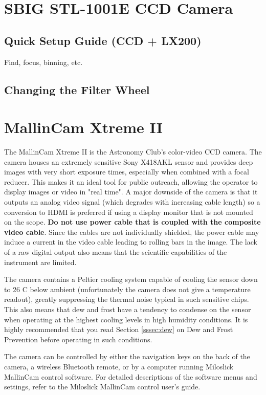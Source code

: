 \documentclass[12pt,titlepage]{article}
\begin{document}
\section{SBIG STL-1001E CCD Camera}
\subsection{Quick Setup Guide (CCD + LX200)}
Find, focus, binning, etc.
\subsection{Changing the Filter Wheel}


\section{MallinCam Xtreme II}
The MallinCam Xtreme II is the Astronomy Club's color-video CCD camera.
The camera houses an extremely sensitive Sony X418AKL sensor and provides deep images with very short exposure times, especially when combined with a focal reducer.
This makes it an ideal tool for public outreach, allowing the operator to display images or video in "real time".
A major downside of the camera is that it outputs an analog video signal (which degrades with increasing cable length) so a conversion to HDMI is preferred if using a display monitor that is not mounted on the scope.
\textbf{Do not use power cable that is coupled with the composite video cable}.
Since the cables are not individually shielded, the power cable may induce a current in the video cable leading to rolling bars in the image.
The lack of a raw digital output also means that the scientific capabilities of the instrument are limited.
\par The camera contains a Peltier cooling system capable of cooling the sensor down to 26 C below ambient (unfortunately the camera does not give a temperature readout), greatly suppressing the thermal noise typical in such sensitive chips.
This also means that dew and frost have a tendency to condense on the sensor when operating at the highest cooling levels in high humidity conditions.
It is highly recommended that you read Section \ref{sssec:dew} on Dew and Frost Prevention before operating in such conditions.
\par The camera can be controlled by either the navigation keys on the back of the camera, a wireless Bluetooth remote, or by a computer running Miloslick MallinCam control software.
For detailed descriptions of the software menus and settings, refer to the Miloslick MallinCam control user's guide\cite{miloslick}.
\end{document}

